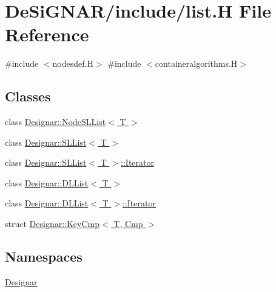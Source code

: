 \hypertarget{list_8_h}{}\section{De\+Si\+G\+N\+A\+R/include/list.H File Reference}
\label{list_8_h}
{\ttfamily \#include $<$nodesdef.\+H$>$}\newline
{\ttfamily \#include $<$containeralgorithms.\+H$>$}\newline
\subsection*{Classes}
\begin{DoxyCompactItemize}
\item 
class \hyperlink{class_designar_1_1_node_s_l_list}{Designar\+::\+Node\+S\+L\+List$<$ T $>$}
\item 
class \hyperlink{class_designar_1_1_s_l_list}{Designar\+::\+S\+L\+List$<$ T $>$}
\item 
class \hyperlink{class_designar_1_1_s_l_list_1_1_iterator}{Designar\+::\+S\+L\+List$<$ T $>$\+::\+Iterator}
\item 
class \hyperlink{class_designar_1_1_d_l_list}{Designar\+::\+D\+L\+List$<$ T $>$}
\item 
class \hyperlink{class_designar_1_1_d_l_list_1_1_iterator}{Designar\+::\+D\+L\+List$<$ T $>$\+::\+Iterator}
\item 
struct \hyperlink{struct_designar_1_1_key_cmp}{Designar\+::\+Key\+Cmp$<$ T, Cmp $>$}
\end{DoxyCompactItemize}
\subsection*{Namespaces}
\begin{DoxyCompactItemize}
\item 
 \hyperlink{namespace_designar}{Designar}
\end{DoxyCompactItemize}
